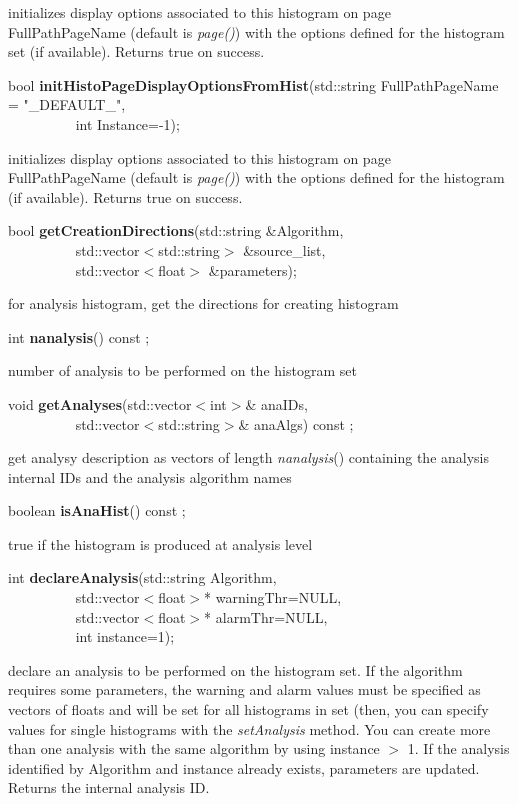  initializes display options associated to this histogram on page
 FullPathPageName (default is {\it page()}) with the
 options defined for the histogram set (if available). Returns true on
 success.


\item    bool {\bf initHistoPageDisplayOptionsFromHist}(std::string FullPathPageName = "\_DEFAULT\_",\\\mbox{}~~~~~~~~~
					   int Instance=-1);

 initializes display options associated to this histogram on page
 FullPathPageName (default is {\it page()}) with the
 options defined for the histogram (if available). Returns true on
 success.


\item    bool {\bf getCreationDirections}(std::string \&Algorithm,\\\mbox{}~~~~~~~~~
			     std::vector$<$std::string$>$ \&source\_list,\\\mbox{}~~~~~~~~~
			     std::vector$<$float$>$ \&parameters);

 for analysis histogram, get the directions for creating histogram


\item    int {\bf nanalysis}() const ;

 number of analysis to be performed on the histogram set


\item    void {\bf getAnalyses}(std::vector$<$int$>$\& anaIDs,\\\mbox{}~~~~~~~~~
		   std::vector$<$std::string$>$\& anaAlgs) const ;

 get analysy description as vectors of length {\it  nanalysis}() containing 
 the analysis internal IDs and the analysis algorithm names


\item    boolean {\bf isAnaHist}() const ;

 true if the histogram is produced at analysis level


\item    int {\bf declareAnalysis}(std::string Algorithm,\\\mbox{}~~~~~~~~~ 
		      std::vector$<$float$>$* warningThr=NULL,\\\mbox{}~~~~~~~~~ 
		      std::vector$<$float$>$* alarmThr=NULL,\\\mbox{}~~~~~~~~~ 
		      int instance=1);

 declare an analysis to be performed on the histogram set. If the algorithm
 requires some parameters, the warning and alarm values must be
 specified as vectors of floats and will be set for all histograms in
 set (then, you can specify values for single histograms with the {\it
 setAnalysis} method. 
 You can create more than one analysis
 with the same algorithm by using instance $>$ 1. If the analysis
 identified by Algorithm and instance already exists, parameters are
 updated. Returns the internal analysis ID.


